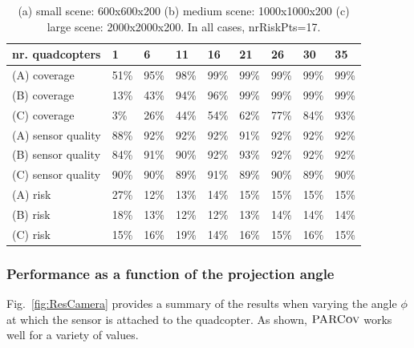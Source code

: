 \documentclass[letterpaper, 10pt, conference]{ieeeconf}
\newcommand{\Function}[1]{\ensuremath{{ \textsc{#1}}}}
\newcommand{\Name}{\Function{\small{PARCov}}}
\begin{document}
\begin{table}[h]
\begin{tabular}{l|p{3mm}p{3mm}p{3mm}p{3mm}p{3mm}p{3mm}p{3mm}p{3mm}}
nr. quadcopters & 1 & 6 & 11 & 16 & 21 & 26 & 30 & 35 \\\hline
(A) coverage   & 51\% & 95\% & 98\% & 99\% & 99\% & 99\% & 99\% & 99\%\\
(B) coverage & 13\% & 43\% & 94\% & 96\% & 99\% & 99\% & 99\% & 99\% \\
(C) coverage & 3\% & 26\% & 44\% & 54\% & 62\% & 77\% & 84\% & 93\%\\\hline
(A) sensor quality   & 88\% & 92\% & 92\% & 92\% & 91\% & 92\% & 92\%
& 92\%\\
(B) sensor quality & 84\% & 91\% & 90\% & 92\% & 93\% & 92\% & 92\% & 92\%\\
(C) sensor quality & 90\% & 90\% & 89\% & 91\% & 89\% & 90\% & 89\% & 90\% \\\hline
(A) risk   & 27\% & 12\% & 13\% & 14\% & 15\% & 15\% & 15\% & 15\% \\
(B) risk & 18\% & 13\% & 12\% & 12\% & 13\% & 14\% & 14\% & 14\%\\
(C) risk & 15\% & 16\% & 19\% & 14\% & 16\% & 15\% & 16\% & 15\%
\end{tabular}

\caption{(a) small scene: 600x600x200 (b) medium scene: 1000x1000x200 (c) large
scene: 2000x2000x200. In all cases, nrRiskPts=17.}

\label{table:ResScene} \end{table}


\subsubsection{Performance as a function of the projection angle}
Fig.~\ref{fig:ResCamera} provides a summary of the results when
varying the angle $\phi$ at which the sensor is attached to the
quadcopter. As shown, $\Name$ works well for a variety of
values.
\end{document}
